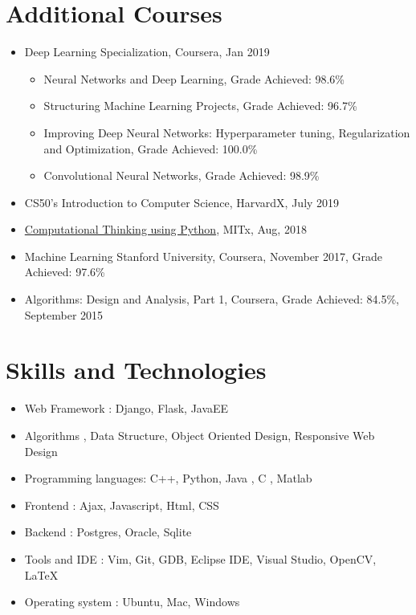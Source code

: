 \documentclass[a4paper,10pt]{article}
\begin{document}
    \section{Additional Courses}
	\begin{itemize}
	        \item Deep Learning Specialization, Coursera, Jan 2019
	            \begin{itemize}
	                \item Neural Networks and Deep Learning, Grade Achieved: 98.6\%
                    \item Structuring Machine Learning Projects, Grade Achieved: 96.7\%
                    \item Improving Deep Neural Networks: Hyperparameter tuning, Regularization and Optimization, Grade Achieved: 100.0\%
                    \item Convolutional Neural Networks, Grade Achieved: 98.9\%
	            \end{itemize}
            \item CS50's Introduction to Computer Science, HarvardX, July 2019
	        \item \href{https://credentials.edx.org/credentials/bc6063317f6249019179899eb0c5aacb/}{Computational Thinking using Python}, MITx, Aug, 2018
	        \item Machine Learning Stanford University, Coursera, November 2017, Grade Achieved: 97.6\%
	        \item Algorithms: Design and Analysis, Part 1, Coursera, Grade Achieved: 84.5\%, September 2015
	    \end{itemize}
	
	\section{Skills and Technologies}
	\begin{itemize}
		\item Web Framework : Django, Flask, JavaEE
		\item Algorithms , Data Structure, Object Oriented Design, Responsive Web Design
        		\item Programming languages: C++, Python, Java , C , Matlab 
		\item Frontend : Ajax, Javascript, Html, CSS
		\item Backend : Postgres, Oracle, Sqlite
	    	\item Tools and IDE : Vim, Git, GDB, Eclipse IDE, Visual Studio, OpenCV, {\LaTeX}
		\item Operating system : Ubuntu, Mac, Windows
	\end{itemize}
	
\end{document}
